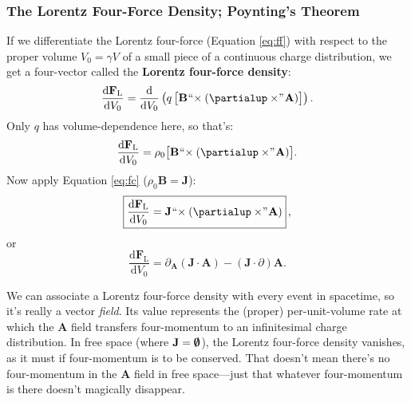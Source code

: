 \documentclass[12pt]{article}
\renewcommand{\vv}[1]{\mathbf{#1}}
\newcommand{\dd}[1]{\mathrm{d}#1}
\begin{document}
\subsubsection{The Lorentz Four-Force Density; Poynting's Theorem}\label{sssec:lffd}

If we differentiate the Lorentz four-force (Equation \ref{eq:ff}) with respect to the proper volume ${V_0 = \gamma V}$ of a small piece of a continuous charge distribution, we get a four-vector called the \textbf{Lorentz four-force density}:
\begin{equation*}
\dfrac{\dd \vv F_{\mathrm{L}}}{\dd V_0} = \dfrac{\dd}{\dd V_0} \left( q \, \bigl[ \vv B \mkern1mu `` \mkern-4mu \times (\partialup \times \mkern-4mu " \mkern1mu \vv A) \bigr]  \right) .
\end{equation*}
Only $q$ has volume-dependence here, so that's:
\begin{equation*}
\dfrac{\dd \vv F_{\mathrm{L}}}{\dd V_0} = \rho_0 \bigl[ \vv B \mkern1mu `` \mkern-4mu \times (\partialup \times \mkern-4mu " \mkern1mu \vv A) \bigr] .
\end{equation*}
Now apply Equation \ref{eq:fc} ($\rho_0 \vv B = \vv J$):
\begin{equation}\label{eq:lffd}
\boxed{ \dfrac{\dd \vv F_{\mathrm{L}}}{\dd V_0} = \vv J \mkern1mu `` \mkern-4mu \times (\partialup \times \mkern-4mu " \mkern1mu \vv A) } \, ,
\end{equation}
or
\begin{equation*}
\dfrac{\dd \vv F_{\mathrm{L}}}{\dd V_0} = \partialup_{\vv A} (\vv J \cdot \vv A) - ( \vv J \cdot \partialup) \vv A .
\end{equation*}

We can associate a Lorentz four-force density with every event in spacetime, so it's really a vector \emph{field}. Its value represents the (proper) per-unit-volume rate at which the $\vv A$ field transfers four-momentum to an infinitesimal charge distribution. In free space (where $\vv J = \textrm{\mbox{\boldmath $\emptyset$}}$), the Lorentz four-force density vanishes, as it must if four-momentum is to be conserved. That doesn't mean there's no four-momentum in the $\vv A$ field in free space---just that whatever four-momentum is there doesn't magically disappear.
\end{document}
